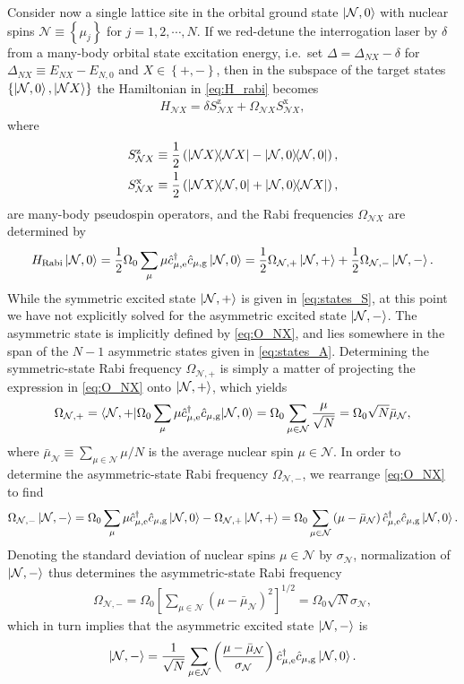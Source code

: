 \documentclass[preprint,showkeys,nofootinbib]{revtex4-1}
\renewcommand{\t}{\text} %
\newcommand{\f}{\dfrac} %
\newcommand{\p}[1]{\left(#1\right)} %
\renewcommand{\sp}[1]{\left[#1\right]} %
\renewcommand{\set}[1]{\left\{#1\right\}} %
\newcommand{\bk}{\braket} %
\newcommand{\g}{\text{g}}
\newcommand{\e}{\text{e}}
\newcommand{\x}{\text{x}}
\newcommand{\z}{\text{z}}
\renewcommand{\c}{\hat{c}}
\newcommand{\N}{\mathcal{N}}
\newcommand{\1}{\mathds{1}}
\begin{document}
Consider now a single lattice site in the orbital ground state
$\ket{\N,0}$ with nuclear spins $\N\equiv\set{\mu_j}$ for
$j=1,2,\cdots,N$.  If we red-detune the interrogation laser by
$\delta$ from a many-body orbital state excitation energy, i.e.~set
$\Delta=\Delta_{NX}-\delta$ for $\Delta_{NX}\equiv E_{NX}-E_{N,0}$ and
$X\in\set{+,-}$, then in the subspace of the target states
$\set{\ket{\N,0},\ket{\N X}}$ the Hamiltonian in \eqref{eq:H_rabi}
becomes
\begin{align}
  H_{\N X} = \delta S_{\N X}^\z + \Omega_{\N X} S_{\N X}^\x,
  \label{eq:H_NX}
\end{align}
where
\begin{align}
  S_{\N X}^\z &\equiv \f12\p{\op{\N X}-\op{\N,0}},
  \label{eq:S_NX_z} \\
  S_{\N X}^\x &\equiv \f12\p{\op{\N X}{\N,0}+\op{\N,0}{\N X}},
  \label{eq:S_NX_x}
\end{align}
are many-body pseudospin operators, and the Rabi frequencies
$\Omega_{\N X}$ are determined by
\begin{align}
  H_{\t{Rabi}}\ket{\N,0}
  = \f12\Omega_0\sum_\mu\mu\c_{\mu,\e}^\dag\c_{\mu,\g}\ket{\N,0}
  = \f12\Omega_{\N,+}\ket{\N,+} + \f12\Omega_{\N,-}\ket{\N,-}.
  \label{eq:O_NX}
\end{align}
While the symmetric excited state $\ket{\N,+}$ is given in
\eqref{eq:states_S}, at this point we have not explicitly solved for
the asymmetric excited state $\ket{\N,-}$.  The asymmetric state is
implicitly defined by \eqref{eq:O_NX}, and lies somewhere in the span
of the $N-1$ asymmetric states given in \eqref{eq:states_A}.
Determining the symmetric-state Rabi frequency $\Omega_{\N,+}$ is
simply a matter of projecting the expression in \eqref{eq:O_NX} onto
$\ket{\N,+}$, which yields
\begin{align}
  \Omega_{\N,+}
  = \bk{\N,+|\Omega_0\sum_\mu\mu\c_{\mu,\e}^\dag\c_{\mu,\g}|\N,0}
  = \Omega_0 \sum_{\mu\in\N} \f{\mu}{\sqrt{N}}
  = \Omega_0 \sqrt{N} \bar\mu_\N,
  \label{eq:O_N+}
\end{align}
where $\bar\mu_\N\equiv\sum_{\mu\in\N}\mu/N$ is the average nuclear
spin $\mu\in\N$.  In order to determine the asymmetric-state Rabi
frequency $\Omega_{\N,-}$, we rearrange \eqref{eq:O_NX} to find
\begin{align}
  \Omega_{\N,-}\ket{\N,-}
  = \Omega_0\sum_\mu\mu\c_{\mu,\e}^\dag\c_{\mu,\g}\ket{\N,0}
  - \Omega_{\N,+}\ket{\N,+}
  = \Omega_0 \sum_{\mu\in\N} \p{\mu - \bar\mu_\N}
  \c_{\mu,\e}^\dag \c_{\mu,\g} \ket{\N,0}.
\end{align}
Denoting the standard deviation of nuclear spins $\mu\in\N$ by
$\sigma_\N$, normalization of $\ket{\N,-}$ thus determines the
asymmetric-state Rabi frequency
\begin{align}
  \Omega_{\N,-}
  = \Omega_0 \sp{\sum_{\mu\in\N}\p{\mu-\bar\mu_\N}^2}^{1/2}
  = \Omega_0 \sqrt{N} \sigma_\N,
  \label{eq:O_N-}
\end{align}
which in turn implies that the asymmetric excited state $\ket{\N,-}$
is
\begin{align}
  \ket{\N,-} = \f1{\sqrt{N}}\sum_{\mu\in\N}
  \p{\f{\mu-\bar\mu_\N}{\sigma_\N}}
  \c_{\mu,\e}^\dag \c_{\mu,\g} \ket{\N,0}.
\end{align}
\end{document}
